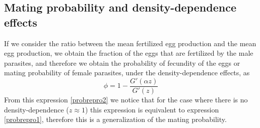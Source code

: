 \documentclass[bimj,fleqn]{w-art}
\theoremstyle{plain}
\theoremstyle{definition}
\begin{document}

\subsection{Mating probability and density-dependence effects}

If we consider the ratio between the mean fertilized egg production and the mean egg production,  we obtain the fraction of the eggs that are fertilized by the male parasites,
and therefore we obtain the probability of fecundity of the eggs or mating probability of female parasites, under the density-dependence effects, as
\begin{equation}\label{probrepro2}
\phi=1-\frac{G'(\alpha z)}{G'(z)} 
\end{equation}
From this expression \eqref{probrepro2} we notice that for the case where there is no density-dependence ($z \approx 1$) this expression is equivalent to expression \eqref{probrepro1}, therefore this is a generalization of the mating probability.
\end{document}
